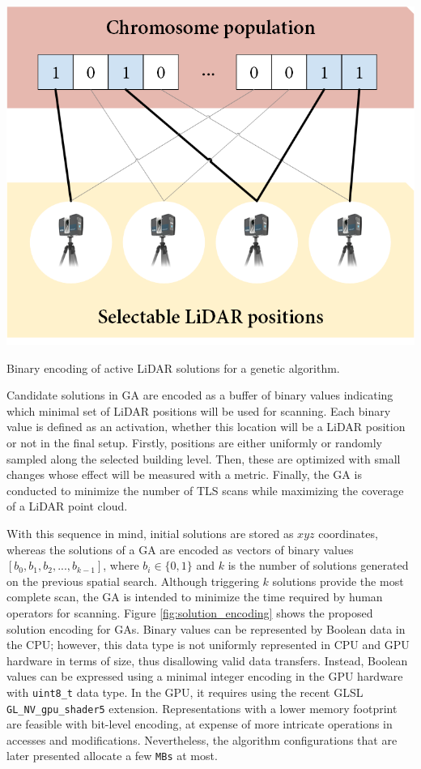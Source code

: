\begin{marginfigure}[.2cm]
    \centering
    \includegraphics[width=\linewidth]{figs/lidar_optimization/solution_encoding.png}
	\caption{Binary encoding of active LiDAR solutions for a genetic algorithm.}
	\label{fig:solution_encoding}
\end{marginfigure}
Candidate solutions in GA are encoded as a buffer of binary values indicating which minimal set of LiDAR positions will be used for scanning. Each binary value is defined as an activation, whether this location will be a LiDAR position or not in the final setup. Firstly, positions are either uniformly or randomly sampled along the selected building level. Then, these are optimized with small changes whose effect will be measured with a metric. Finally, the GA is conducted to minimize the number of TLS scans while maximizing the coverage of a LiDAR point cloud.

With this sequence in mind, initial solutions are stored as $xyz$ coordinates, whereas the solutions of a GA are encoded as vectors of binary values $[b_0, b_1, b_2, ..., b_{k-1}]$, where $b_i \in \{0, 1\}$ and $k$ is the number of solutions generated on the previous spatial search. Although triggering $k$ solutions provide the most complete scan, the GA is intended to minimize the time required by human operators for scanning. Figure \ref{fig:solution_encoding} shows the proposed solution encoding for GAs. Binary values can be represented by Boolean data in the CPU; however, this data type is not uniformly represented in CPU and GPU hardware in terms of size, thus disallowing valid data transfers. Instead, Boolean values can be expressed using a minimal integer encoding in the GPU hardware with \verb|uint8_t| data type. In the GPU, it requires using the recent GLSL \verb|GL_NV_gpu_shader5| extension. Representations with a lower memory footprint are feasible with bit-level encoding, at expense of more intricate operations in accesses and modifications. Nevertheless, the algorithm configurations that are later presented allocate a few \verb|MBs| at most.

